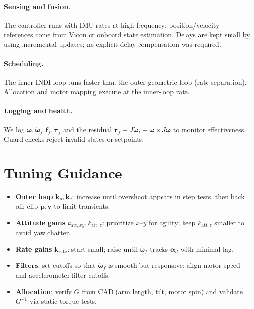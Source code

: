 \paragraph{Sensing and fusion.}
The controller runs with IMU rates at high frequency; position/velocity references come from Vicon or onboard state estimation.
Delays are kept small by using incremental updates; no explicit delay compensation was required.

\paragraph{Scheduling.}
The inner INDI loop runs faster than the outer geometric loop (rate separation).
Allocation and motor mapping execute at the inner-loop rate.

\paragraph{Logging and health.}
We log $\boldsymbol{\omega},\dot{\boldsymbol{\omega}}_f,\mathbf{f}_f,\boldsymbol{\tau}_f$ and the residual
$\boldsymbol{\tau}_f - J\dot{\boldsymbol{\omega}}_f - \boldsymbol{\omega}\times J\boldsymbol{\omega}$ to monitor effectiveness.
Guard checks reject invalid states or setpoints.

\section{Tuning Guidance}\label{sec:tuning}
\begin{itemize}
  \item \textbf{Outer loop} $\mathbf{k}_p,\mathbf{k}_v$: increase until overshoot appears in step tests, then back off; clip $\tilde{\mathbf{p}},\tilde{\mathbf{v}}$ to limit transients.
  \item \textbf{Attitude gains} $k_{\text{att},xy},k_{\text{att},z}$: prioritize $x$–$y$ for agility; keep $k_{\text{att},z}$ smaller to avoid yaw chatter.
  \item \textbf{Rate gains} $\mathbf{k}_{\text{rate}}$: start small; raise until $\dot{\boldsymbol{\omega}}_f$ tracks $\boldsymbol{\alpha}_d$ with minimal lag.
  \item \textbf{Filters}: set cutoffs so that $\dot{\boldsymbol{\omega}}_f$ is smooth but responsive; align motor-speed and accelerometer filter cutoffs.
  \item \textbf{Allocation}: verify $G$ from CAD (arm length, tilt, motor spin) and validate $G^{-1}$ via static torque tests.
\end{itemize}

